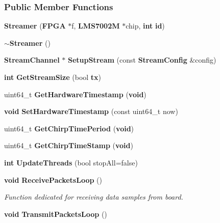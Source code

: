 \subsubsection*{Public Member Functions}
\begin{DoxyCompactItemize}
\item 
{\bf Streamer} ({\bf F\+P\+GA} $\ast$f, {\bf L\+M\+S7002M} $\ast$chip, {\bf int} {\bf id})
\item 
{\bf $\sim$\+Streamer} ()
\item 
{\bf Stream\+Channel} $\ast$ {\bf Setup\+Stream} (const {\bf Stream\+Config} \&config)
\item 
{\bf int} {\bf Get\+Stream\+Size} (bool {\bf tx})
\item 
uint64\+\_\+t {\bf Get\+Hardware\+Timestamp} ({\bf void})
\item 
{\bf void} {\bf Set\+Hardware\+Timestamp} (const uint64\+\_\+t now)
\item 
uint64\+\_\+t {\bf Get\+Chirp\+Time\+Period} ({\bf void})
\item 
uint64\+\_\+t {\bf Get\+Chirp\+Time\+Stamp} ({\bf void})
\item 
{\bf int} {\bf Update\+Threads} (bool stop\+All=false)
\item 
{\bf void} {\bf Receive\+Packets\+Loop} ()
\begin{DoxyCompactList}\small\item\em Function dedicated for receiving data samples from board. \end{DoxyCompactList}\item 
{\bf void} {\bf Transmit\+Packets\+Loop} ()
\end{DoxyCompactItemize}
